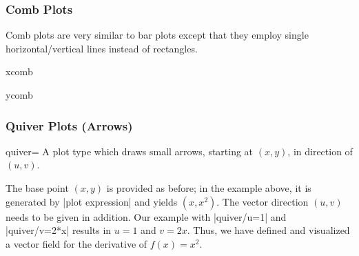 {\subsubsection{Comb Plots}
Comb plots are very similar to bar plots except that they employ single horizontal/vertical lines instead of rectangles.

\begin{plottype}{xcomb}
\begin{codeexample}[]
\end{codeexample}
\end{plottype}

\begin{plottype}{ycomb}
\begin{codeexample}[]
\end{codeexample}
\end{plottype}

\subsubsection{Quiver Plots (Arrows)}
\label{sec:pgfplots:quiver2d}
\begin{plottype}[/pgfplots]{quiver=\textcolor{black}{}}
	A plot type which draws small arrows, starting at $(x,y)$, in direction of $(u,v)$.
\begin{codeexample}[]
\end{codeexample}

	The base point $(x,y)$ is provided as before; in the example above, it is generated by |plot expression| and yields $(x,x^2)$. The vector direction $(u,v)$ needs to be given in addition. Our example with |quiver/u=1| and |quiver/v=2*x| results in $u=1$ and $v=2x$. Thus, we have defined and visualized a vector field for the derivative of $f(x) = x^2$.


\end{plottype}}

